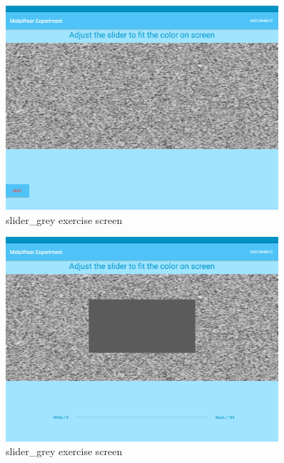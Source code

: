 \begin{figure}[h!]
\centering
\includegraphics[width=0.9\textwidth]{figures/tablet_screen9.png}
\caption{slider\_grey exercise screen}
\label{appendix_app_screen_9}
\end{figure}

\begin{figure}[h!]
\centering
\includegraphics[width=0.9\textwidth]{figures/tablet_screen10.png}
\caption{slider\_grey exercise screen}
\label{appendix_app_screen_10}
\end{figure}

